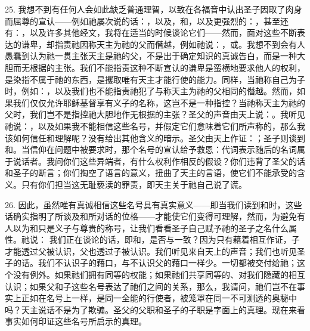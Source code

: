 25. 我想不到有任何人会如此缺乏普通理智，以致在各福音中认出圣子因取了肉身而屈尊的宣认——例如祂屡次说的话：，以及，和，以及更强烈的：，甚至还有：，以及许多其他经文，我将在适当的时候谈论它们——然而，面对这些不断表达的谦卑，却指责祂因称天主为祂的父而僭越，例如祂说：，或。我想不到会有人愚蠢到认为祂一贯主张天主是祂的父，不是出于确定知识的真诚告白，而是一种大胆而无根据的主张。我们不能指责这种不断宣认的谦卑是蛮横地要求他人的权利，是染指不属于祂的东西，是攫取唯有天主才能行使的能力。同样，当祂称自己为子时，例如：，以及我们也不能指责祂犯了与称天主为祂的父相同的僭越。然而，如果我们仅仅允许耶稣基督享有义子的名称，这岂不是一种指控？当祂称天主为祂的父时，我们岂不是指控祂大胆地作无根据的主张？圣父的声音由天上说：。我听见祂说：，以及如果我不能相信这些名号，并假定它们意味着它们所声称的，那么我该如何信任和理解呢？没有给出其他含义的暗示。圣父由天上作证：；圣子则谈到和。当信仰在问题中被要求时，那个名号的宣认给予救恩：代词表示随后的名词属于说话者。我问你们这些异端者，有什么权利作相反的假设？你们违背了圣父的话和圣子的断言；你们掏空了语言的意义，扭曲了天主的言语，使它们不能承受的含义。只有你们担当这无耻亵渎的罪责，即天主关于祂自己说了谎。\par

26. 因此，虽然唯有真诚相信这些名号具有真实意义——即当我们读到和时，这些话确实指明了所谈及和所对话的位格——才能使它们变得可理解，然而，为避免有人以为和只是义子与尊贵的称号，让我们看看圣子自己赋予祂的圣子之名什么属性。祂说： 我们正在谈论的话，即和，是否与一致？因为只有藉着相互作证，子才能透过父被认识，父也透过子被认识。我们听见来自天上的声音；我们也听见圣子的话。我们不认识子的藉口，与不认识父的藉口一样少。一切都被交付给祂；这个没有例外。如果祂们拥有同等的权能；如果祂们共享同等的、对我们隐藏的相互认识；如果父和子这些名号表达了祂们之间的关系，那么，我请问，祂们岂不在事实上正如在名号上一样，是同一全能的行使者，被笼罩在同一不可测透的奥秘中吗？天主说话不是为了欺骗。圣父的父职和圣子的子职是字面上的真理。现在来看事实如何印证这些名号所启示的真理。\par

